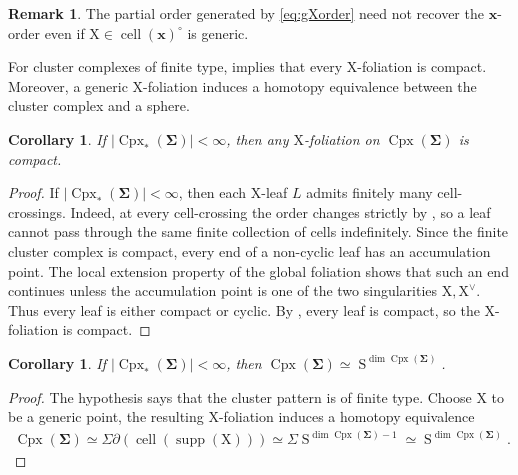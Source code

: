 \documentclass[11pt,reqno]{amsart}
\theoremstyle{plain}
\newtheorem{corollary}[theorem]{Corollary}
\theoremstyle{definition}
\newtheorem{remark}[theorem]{Remark}
\numberwithin{equation}{section}
\newcommand\<{\langle}
\renewcommand\>{\rangle}
\newcommand{\on}[1]{\operatorname{#1}}
\def\CCx{\on{Cpx}}   %
\def\cc{\on{cell}}  %
\def\sphere{\on{S}}   %
\def\susp{\Sigma}       %
\def\sink{X}
\newcommand{\ccpt}[1]{\mathrm{#1}}%
\def\xevo{\ccpt{X}}%
\def\seeds{\mathbf{\Sigma}}
\def\xx{\mathbf{x}}%
\def\supp{\on{supp}}
\newcommand{\DT}[1]{#1^{\vee}}
\def\Xevo{\DT{\ccpt{X}}}
\begin{document}
\begin{remark}
    The partial order generated by \eqref{eq:gXorder} need not recover the ${\xx}$-order even if $\xevo\in\cc(\xx)^\circ$ is generic.
\end{remark}


For cluster complexes of finite type,  implies that every $\xevo$-foliation is compact. Moreover, a generic
$\xevo$-foliation induces a homotopy equivalence between the cluster complex and a sphere.

\begin{corollary}
If $|\CCx_*(\seeds)|<\infty$, then any $\xevo$-foliation on $\CCx(\seeds)$ is compact.
\end{corollary}

\begin{proof}
If $|\CCx_*(\seeds)|<\infty$, then each $\xevo$-leaf $L$ admits finitely many cell-crossings.
Indeed, at every cell-crossing the order changes strictly by , so a leaf cannot pass through the same finite collection of cells indefinitely.
Since the finite cluster complex is compact, every end of a non-cyclic leaf has an accumulation point.  The local extension property of
the global foliation shows that such an end continues unless the accumulation
point is one of the two singularities $\xevo,\Xevo$.  Thus every leaf is either
compact or cyclic.  By , every leaf is compact, so the
$\xevo$-foliation is compact.
\end{proof}

\begin{corollary}
If $|\CCx_*(\seeds)|<\infty$, then $\CCx(\seeds)\simeq\sphere^{\dim\CCx(\seeds)}$.
\end{corollary}

\begin{proof}
The hypothesis says that the cluster pattern is of finite type.  
Choose $\xevo$ to be a generic point, the resulting $\xevo$-foliation induces a homotopy equivalence
\begin{gather}
    \CCx(\seeds)\simeq\susp\partial(\cc(\supp(\xevo)))\simeq\susp \sphere^{\dim\CCx(\seeds)-1}\simeq\sphere^{\dim\CCx(\seeds)}.
\end{gather}
\end{proof}
\end{document}
